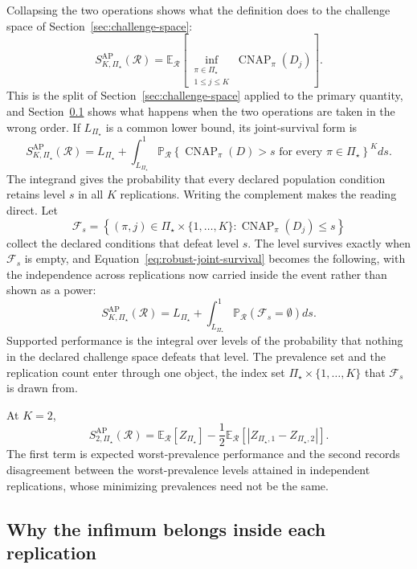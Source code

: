 \documentclass[11pt]{article}
\newcommand{\CNAP}{\operatorname{CNAP}}
\newcommand{\Regime}{\mathcal{R}}
\newcommand{\PSet}{\Pi_\star}
\newcommand{\E}{\mathbb{E}}
\newcommand{\Prb}{\mathbb{P}}
\newcommand{\SRob}{S_{K,\PSet}^{\mathrm{AP}}(\Regime)}
\newcommand{\RefSet}{\mathcal{F}}
\theoremstyle{remark}
\begin{document}
Collapsing the two operations shows what the definition does to the challenge space of Section~\ref{sec:challenge-space}:
\[
\SRob
=
\E_{\Regime}
\left[
\inf_{\substack{\pi\in\PSet\\1\leq j\leq K}}
\CNAP_\pi(D_j)
\right].
\]
This is the split of Section~\ref{sec:challenge-space} applied to the primary quantity, and Section~\ref{sec:infimum-inside} shows what happens when the two operations are taken in the wrong order.
If $L_{\PSet}$ is a common lower bound, its joint-survival form is
\begin{equation}
\SRob
=
L_{\PSet}
+
\int_{L_{\PSet}}^1
\Prb_{\Regime}
\left\{
\CNAP_\pi(D)>s
\text{ for every }\pi\in\PSet
\right\}^{K}
ds.
\label{eq:robust-joint-survival}
\end{equation}
The integrand gives the probability that every declared population condition retains level $s$ in all $K$ replications. Writing the complement makes the reading direct. Let
\begin{equation}
\RefSet_s
=
\left\{
(\pi,j)\in\PSet\times\{1,\ldots,K\}
:
\CNAP_\pi(D_j)\leq s
\right\}
\label{eq:refutation-class}
\end{equation}
collect the declared conditions that defeat level $s$. The level survives exactly when $\RefSet_s$ is empty, and Equation~\eqref{eq:robust-joint-survival} becomes the following, with the independence across replications now carried inside the event rather than shown as a power:
\begin{equation}
\SRob
=
L_{\PSet}
+
\int_{L_{\PSet}}^{1}
\Prb_{\Regime}
\left(
\RefSet_s=\emptyset
\right)
ds .
\label{eq:refutation-integral}
\end{equation}
Supported performance is the integral over levels of the probability that nothing in the declared challenge space defeats that level. The prevalence set and the replication count enter through one object, the index set $\PSet\times\{1,\ldots,K\}$ that $\RefSet_s$ is drawn from.

At $K=2$,
\begin{equation}
S_{2,\PSet}^{\mathrm{AP}}(\Regime)
=
\E_{\Regime}[Z_{\PSet}]
-
\frac12
\E_{\Regime}
\left[
|Z_{\PSet,1}-Z_{\PSet,2}|
\right].
\label{eq:robust-k2}
\end{equation}
The first term is expected worst-prevalence performance and the second records disagreement between the worst-prevalence levels attained in independent replications, whose minimizing prevalences need not be the same.

\subsection{Why the infimum belongs inside each replication}
\label{sec:infimum-inside}
\end{document}
